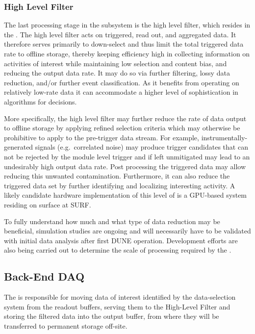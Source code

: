 \subsubsection{High Level Filter}
\label{sec:fd-daq:design-data-reduction}

The last processing stage in the  subsystem is the
high level filter, which resides in the .
The high level filter acts on triggered, read out, and aggregated data. 
It therefore serves primarily to down-select and thus
limit the total triggered data rate to offline storage, thereby keeping 
efficiency high in collecting information on activities of interest
while maintaining low selection and content bias, and reducing the output data
rate. It may do so via 
further filtering, lossy data reduction, and/or further event
classification.
As it benefits from operating on relatively low-rate data it can accommodate a higher level of
sophistication in algorithms for  decisions.

More specifically, the high level filter may further reduce the rate of data output to offline storage by
applying refined selection criteria which may otherwise be prohibitive
to apply to the pre-trigger data stream.  For example, instrumentally-generated signals (e.g.~correlated noise)
may produce trigger candidates that can not be rejected by the module
level trigger and if left unmitigated may lead to an undesirably high
output data rate. 
Post processing the triggered data may allow reducing this unwanted
contamination.
Furthermore, it can also reduce the triggered data set by further identifying
and localizing interesting activity. A likely candidate hardware
implementation of this level of  is a GPU-based system
residing on surface at SURF.

To fully understand how much and what type of data reduction may be
beneficial, simulation studies are ongoing \cite{bib:docdb11311} and will
necessarily have to be
validated with initial data analysis after
first DUNE  operation. Development efforts are also being
carried out to determine the scale of 
processing required by the .


\subsection{Back-End DAQ}
\label{sec:fd-daq:design-backend}

The   is responsible for moving data of interest identified by the data-selection system from the readout  buffers, serving them to the High-Level Filter and storing the filtered data into the output buffer, from where they will be transferred to permanent storage off-site.

